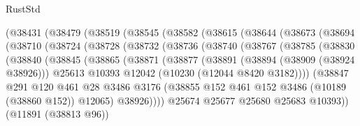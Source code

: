 \begin{lexlean}{RustStd}
\begin{coremodule}
          (@38431
            (@38479
              (@38519
                (@38545
                  (@38582
                    (@38615
                      (@38644
                        (@38673
                          (@38694
                            (@38710
                              (@38724
                                (@38728
                                  (@38732
                                    (@38736
                                      (@38740
                                        (@38767
                                          (@38785
                                            (@38830
                                              (@38840
                                                (@38845
                                                  (@38865
                                                    (@38871
                                                      (@38877
                                                        (@38891
                                                          (@38894 (@38909 (@38924 @38926)))
                                                          @25613
                                                          @10393
                                                          @12042
                                                          (@10230 (@12044 @8420 @3182))))
                                                      (@38847
                                                        @291
                                                        @120
                                                        @461
                                                        @28
                                                        @3486
                                                        @3176
                                                        (@38855
                                                          @152
                                                          @461
                                                          @152
                                                          @3486
                                                          (@10189 (@38860 @152))
                                                          @12065)
                                                        @38926))))
                                                @25674
                                                @25677
                                                @25680
                                                @25683
                                                @10393))
                                            (@11891 (@38813 @96))

\end{coremodule}
\end{lexlean}
